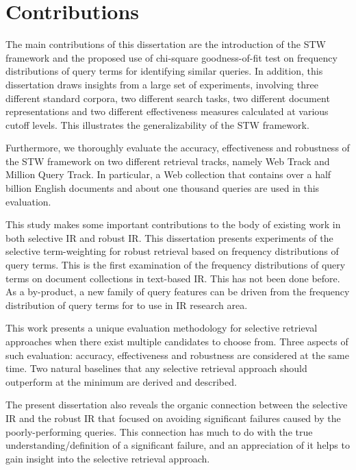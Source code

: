 \section{Contributions}

The main contributions of this dissertation are the introduction of the STW framework and the proposed use of chi-square goodness-of-fit test  
on frequency distributions of query terms for identifying similar queries.
In addition, this dissertation draws insights from a large set of experiments, involving three different standard corpora, two different search tasks, two different document representations and two different effectiveness measures calculated at various cutoff levels.
This illustrates the generalizability of the STW framework.

Furthermore, we thoroughly evaluate the accuracy, effectiveness and robustness of the STW framework on two different retrieval tracks, namely Web Track and Million Query Track.
In particular, a Web collection that contains over a half billion English documents and about one thousand queries are used in this evaluation.

This study makes some important contributions to the body of existing work in both selective IR and robust IR. 
This dissertation presents experiments of the selective term-weighting for robust retrieval based on frequency distributions of query terms. 
This is the first examination of the frequency distributions of query terms on document collections in text-based IR. 
This has not been done before. 
As a by-product, a new family of query features can be driven from the frequency distribution of query terms for to use in IR research area.

This work presents a unique evaluation methodology for selective retrieval approaches when there exist multiple candidates to choose from.
Three aspects of such evaluation: accuracy, effectiveness and robustness are considered at the same time.
Two natural baselines that any selective retrieval approach should outperform at the minimum are derived and described.

The present dissertation also reveals the organic connection between the selective IR and the robust IR that focused on avoiding significant failures caused by the poorly-performing queries. 
This connection has much to do with the true understanding/definition of a significant failure, and an appreciation of it helps to gain insight into the selective retrieval approach.

